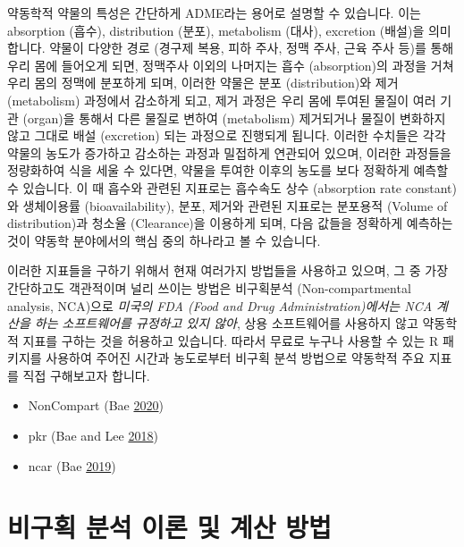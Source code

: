 \documentclass[
  12pt,
]{krantz}
\providecommand{\tightlist}{%
  \setlength{\itemsep}{0pt}\setlength{\parskip}{0pt}}
\begin{document}
약동학적 약물의 특성은 간단하게 ADME라는 용어로 설명할 수 있습니다.
이는 absorption (흡수), distribution (분포), metabolism (대사), excretion (배설)을 의미합니다.
약물이 다양한 경로 (경구제 복용, 피하 주사, 정맥 주사, 근육 주사 등)를 통해 우리 몸에 들어오게 되면, 정맥주사 이외의 나머지는 흡수 (absorption)의 과정을 거쳐 우리 몸의 정맥에 분포하게 되며, 이러한 약물은 분포 (distribution)와 제거 (metabolism) 과정에서 감소하게 되고, 제거 과정은 우리 몸에 투여된 물질이 여러 기관 (organ)을 통해서 다른 물질로 변하여 (metabolism) 제거되거나 물질이 변화하지 않고 그대로 배설 (excretion) 되는 과정으로 진행되게 됩니다.
이러한 수치들은 각각 약물의 농도가 증가하고 감소하는 과정과 밀접하게 연관되어 있으며, 이러한 과정들을 정량화하여 식을 세울 수 있다면, 약물을 투여한 이후의 농도를 보다 정확하게 예측할 수 있습니다.
이 때 흡수와 관련된 지표로는 흡수속도 상수 (absorption rate constant)와 생체이용률 (bioavailability), 분포, 제거와 관련된 지표로는 분포용적 (Volume of distribution)과 청소율 (Clearance)을 이용하게 되며, 다음 값들을 정확하게 예측하는 것이 약동학 분야에서의 핵심 중의 하나라고 볼 수 있습니다.

이러한 지표들을 구하기 위해서 현재 여러가지 방법들을 사용하고 있으며, 그 중 가장 간단하고도 객관적이며 널리 쓰이는 방법은 비구획분석 (Non-compartmental analysis, NCA)으로 \emph{미국의 FDA (Food and Drug Administration)에서는 NCA 계산을 하는 소프트웨어를 규정하고 있지 않아}, 상용 소프트웨어를 사용하지 않고 약동학적 지표를 구하는 것을 허용하고 있습니다.
따라서 무료로 누구나 사용할 수 있는 R 패키지를 사용하여 주어진 시간과 농도로부터 비구획 분석 방법으로 약동학적 주요 지표를 직접 구해보고자 합니다.

\begin{itemize}
\tightlist
\item
  NonCompart (Bae \protect\hyperlink{ref-R-NonCompart}{2020})
\item
  pkr (Bae and Lee \protect\hyperlink{ref-R-pkr}{2018})
\item
  ncar (Bae \protect\hyperlink{ref-R-ncar}{2019})
\end{itemize}

\hypertarget{ncar-method}{%
\section{비구획 분석 이론 및 계산 방법}\label{ncar-method}}
\end{document}
